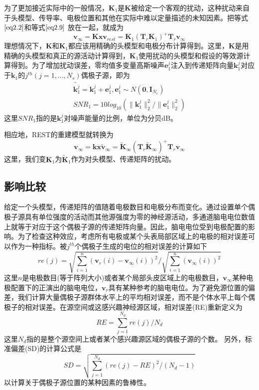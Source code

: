 为了更加接近实际中的一般情况，$\mathbf{K}_1$是$\mathbf{K}$被给定一个客观的扰动，这种扰动来自于头模型、传导率、电极位置和其他在实际中难以定量描述的未知因素。把等式$\eqref{eq2.2}$和等式$\eqref{eq2.9}$
放在一起，就成为
\begin{equation*}
\mathbf{v}_{\infty}=\mathbf{Kx}
\mathbf{v}_{rest}=\mathbf{K}_1(\mathbf{T}_r\mathbf{K}_1)^{+}\mathbf{T}_{r}\mathbf{v}_{\infty}
\end{equation*}
理想情况下，$\mathbf{K}$和$\mathbf{K}_1$都应该用精确的头模型和电极分布计算得到。这里，$\mathbf{K}$是用精确的头模型和真正的源活动计算得到，$\mathbf{K}_1$使用扰动的头模型和假设的等效源计算得到。为了增加扰动误差，零均值多变量高斯噪声$\mathbf{e}_1^j$注入到传递矩阵向量$\mathbf{k}_1^j$对应于$\mathbf{k}_1$的$j^{th}(j=1,...,N_s)$偶极子源，即为
\begin{equation*}
\begin{split}
\tilde{\mathbf{k}_1^j}=\mathbf{k}_1^j+\mathbf{e}_1^j,\mathbf{e}_1^j\sim{N(\mathbf{0},\mathbf{I}_{N_e})}\\
SNR_1=10log_10(\lVert\mathbf{k}_1^{j}\rVert_2^2/{\lVert\mathbf{e}_1^{j}\rVert_2^2})
\end{split}
\end{equation*}
这里$SNR_1$指的是$\mathbf{k}_1^j$对噪声能量的比例，单位为分贝dB。

相应地，REST的重建模型就转换为
\begin{equation}\label{eq2.10}
\mathbf{v}_{\infty}=\mathbf{kx}
\tilde{\mathbf{v}}_{\infty}=\tilde{\mathbf{K}}_{\infty}(\mathbf{T}_{r}\tilde{\mathbf{K}}_{\infty})^{+}\mathbf{T}_{r}\mathbf{v}_{\infty}
\end{equation}
这里，我们变$\mathbf{K}_1$为$\tilde{\mathbf{K}}_1$作为对头模型、传递矩阵的扰动。

\subsection{影响比较}
给定一个头模型，传递矩阵的值随着电极数目和电极分布而变化。通过设置单个偶极子源具有单位强度的活动而其他源强度为零的神经源活动，多通道脑电电位数值上就等于对应于这个偶极子源的传递矩阵向量。因此，脑电电位受到电极配置的影响。为了检查这种效应，考虑所有电极或某个头表局部区域上的电极的相对误差可以作为一种指标。被$j^{th}$个偶极子生成的电位的相对误差的计算如下
\begin{equation*}
re(j)=\sqrt{\sum_{i=1}^n(\mathbf{v}_r(i)-\mathbf{v}_{\infty}(i))^2}/\sqrt{\sum_{i=1}^n(\mathbf{v}_{\infty}(i))^2}
\end{equation*}
这里$n$是电极数目(等于阵列大小)或者某个局部头皮区域上的电极数目，$\mathbf{v}_{\infty}$某种电极配置下的正演出的脑电电位，$\mathbf{v}_r$具有某种参考的脑电电位。为了避免源位置的偏差，我们计算大量偶极子源群体水平上的平均相对误差，而不是个体水平上每个偶极子的相对误差。在源空间或这感兴趣神经源区域，相对误差(RE)重新定义为
\begin{equation*}
RE=\sum_{j=1}^{N_d}re(j)/{N_d}
\end{equation*}
这里$N_d$指的是整个源空间上或者某个感兴趣源区域的偶极子源的个数。 另外，标准偏差(SD)的计算公式是
\begin{equation*}
SD=\sqrt{\sum_{j=1}^{N_d}(re(j)-RE)^2/(N_d-1)}
\end{equation*}
以计算关于偶极子源位置的某种因素的鲁棒性。

